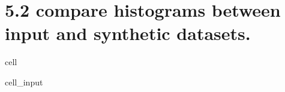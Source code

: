 \documentclass[letterpaper,10pt,english]{jupyterBook}
\begin{document}
\section{5.2 compare histograms between input and synthetic datasets.}
\label{\detokenize{src/test/SynthNAV0:id7}}
\begin{sphinxuseclass}{cell}\begin{sphinxVerbatimInput}

\begin{sphinxuseclass}{cell_input}
\begin{sphinxVerbatim}[commandchars=\\\{\}]
   
\end{sphinxVerbatim}

\end{sphinxuseclass}\end{sphinxVerbatimInput}
\begin{sphinxVerbatimOutput}


\end{sphinxVerbatimOutput}
\end{sphinxuseclass}
\end{document}

